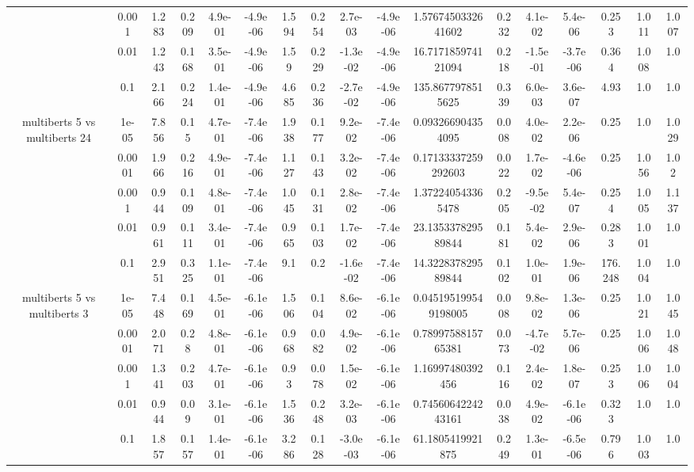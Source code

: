 \begin{tabular}{|c|c|c|c|c|c|c|c|c|c|c|c|c|c|c|c|c|}
 & 0.001 & 1.283 & 0.209 & 4.9e-01 & -4.9e-06 & 1.594 & 0.254 & 2.7e-03 & -4.9e-06 & 1.5767450332641602 & 0.232 & 4.1e-02 & 5.4e-06 & 0.253 & 1.011 & 1.007 \\
 & 0.01 & 1.243 & 0.168 & 3.5e-01 & -4.9e-06 & 1.59 & 0.229 & -1.3e-02 & -4.9e-06 & 16.717185974121094 & 0.218 & -1.5e-01 & -3.7e-06 & 0.364 & 1.008 & 1.0 \\
 & 0.1 & 2.166 & 0.224 & 1.4e-01 & -4.9e-06 & 4.685 & 0.236 & -2.7e-02 & -4.9e-06 & 135.8677978515625 & 0.339 & 6.0e-03 & 3.6e-07 & 4.93 & 1.0 & 1.0 \\
\hline
\multirow{5}{*}{multiberts 5 vs multiberts 24} & 1e-05 & 7.856 & 0.15 & 4.7e-01 & -7.4e-06 & 1.938 & 0.177 & 9.2e-02 & -7.4e-06 & 0.093266904354095 & 0.008 & 4.0e-02 & 2.2e-06 & 0.25 & 1.0 & 1.029 \\
 & 0.0001 & 1.966 & 0.216 & 4.9e-01 & -7.4e-06 & 1.127 & 0.143 & 3.2e-02 & -7.4e-06 & 0.17133337259292603 & 0.022 & 1.7e-02 & -4.6e-06 & 0.25 & 1.056 & 1.02 \\
 & 0.001 & 0.944 & 0.109 & 4.8e-01 & -7.4e-06 & 1.045 & 0.131 & 2.8e-02 & -7.4e-06 & 1.372240543365478 & 0.205 & -9.5e-02 & 5.4e-07 & 0.254 & 1.005 & 1.137 \\
 & 0.01 & 0.961 & 0.111 & 3.4e-01 & -7.4e-06 & 0.965 & 0.103 & 1.7e-02 & -7.4e-06 & 23.135337829589844 & 0.181 & 5.4e-02 & 2.9e-06 & 0.283 & 1.001 & 1.0 \\
 & 0.1 & 2.951 & 0.325 & 1.1e-01 & -7.4e-06 & 9.1 & 0.2 & -1.6e-02 & -7.4e-06 & 14.322837829589844 & 0.102 & 1.0e-01 & 1.9e-06 & 176.248 & 1.004 & 1.0 \\
\hline
\multirow{5}{*}{multiberts 5 vs multiberts 3} & 1e-05 & 7.448 & 0.169 & 4.5e-01 & -6.1e-06 & 1.506 & 0.104 & 8.6e-02 & -6.1e-06 & 0.045195199549198005 & 0.008 & 9.8e-02 & 1.3e-06 & 0.25 & 1.021 & 1.045 \\
 & 0.0001 & 2.071 & 0.28 & 4.8e-01 & -6.1e-06 & 0.968 & 0.082 & 4.9e-02 & -6.1e-06 & 0.7899758815765381 & 0.073 & -4.7e-02 & 5.7e-06 & 0.25 & 1.006 & 1.048 \\
 & 0.001 & 1.341 & 0.203 & 4.7e-01 & -6.1e-06 & 0.93 & 0.078 & 1.5e-02 & -6.1e-06 & 1.16997480392456 & 0.116 & 2.4e-02 & 1.8e-07 & 0.253 & 1.006 & 1.004 \\
 & 0.01 & 0.944 & 0.09 & 3.1e-01 & -6.1e-06 & 1.536 & 0.248 & 3.2e-03 & -6.1e-06 & 0.7456064224243161 & 0.038 & 4.9e-02 & -6.1e-06 & 0.323 & 1.0 & 1.0 \\
 & 0.1 & 1.857 & 0.157 & 1.4e-01 & -6.1e-06 & 3.286 & 0.128 & -3.0e-03 & -6.1e-06 & 61.1805419921875 & 0.249 & 1.3e-01 & -6.5e-06 & 0.796 & 1.003 & 1.0 \\

\end{tabular}
